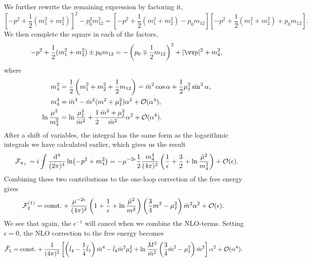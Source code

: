 We further rewrite the remaining expression by factoring it,
%
\begin{equation}
    \left[-p^2 + \frac{1}{2}(m_1^2 + m_2^2)\right]^2 - p_0^2 m_{12}^2
    = \left[-p^2 + \frac{1}{2}(m_1^2 + m_2^2) - p_0 m_{12} \right]
    \left[-p^2 + \frac{1}{2}(m_1^2 + m_2^2) + p_0 m_{12} \right].
\end{equation}
%
We then complete the square in each of the factors,
%
\begin{equation}
    - p^2 + \frac{1}{2}(m_1^2 + m_2^2) \pm p_0 m_{12}
    = - \left(p_0 \mp \frac{1}{2}m_{12}\right)^2 + |\vv p|^2 + m_4^2,
\end{equation}
%
where
%
\begin{align}
    m_4^2 
    & = \frac{1}{2}
    \left(
        m_1^2 +m_2^2 +\frac{1}{2}m_{12}
     \right)
    = \bar m^2 \cos\alpha + \frac{1}{2} \mu_I^2 \sin^2 \alpha, \\
    m_4^4
    & = \bar m^4 - \bar m^2(m^2 + \mu_I^2) \alpha^2 + \mathcal O(\alpha^4), \\
    \ln \frac{\mu^2}{m_4^2} 
    & = \ln \frac{\mu_I^2}{\bar m^2} 
    + \frac{1}{2}\frac{\bar m^2 + \mu_I^2}{\bar m^2}\alpha^2
    + \mathcal O(\alpha^4).
\end{align}
%
After a shift of variables, the integral has the same form as the logarithmic integrals we have calculated earlier, which gives us the result
%
\begin{equation}
    \mathcal{F}_{\pi_\pm}
    = i \int \frac{\dd^4}{(2\pi)^4}
    \ln(-p^2 + m_4^2)
    = 
    - \mu^{-2\epsilon}\frac{1}{2} \frac{m_4^4}{(4 \pi)^2}
    \left(\frac{1}{\epsilon} + \frac{3}{2} + \ln \frac{\tilde \mu^2}{m_4^2}\right)+ \mathcal{O}(\epsilon).
\end{equation}
%
Combining these two contributions to the one-loop correction of the free energy gives
%
\begin{align*}
    \mathcal{F}_2^{(1)}
    &=
    \mathrm{const.}
    +
    \frac{\mu^{-2 \epsilon } }{(4 \pi)^2} 
    \left(1 + \frac{1}{\epsilon} + \ln \frac{\tilde \mu^2}{m^2}\right)
    \left(\frac{3}{4}m^2 - \mu_I^2\right)
    \bar m^2 \alpha^2+ \mathcal{O}(\epsilon).
\end{align*}
%
We see that again, the $\epsilon^{-1}$ will cancel when we combine the NLO-terms.
Setting $\epsilon = 0$, the NLO correction to the free energy becomes
%
\begin{align}
    \tilde {\mathcal{F}}_1
    & = 
    \mathrm{const.}+ 
    \frac{1}{(4\pi)^2}
    \left[
        \left(
            \bar l_4 - \frac{1}{4}\bar l_3
        \right)\bar m^4
        -\bar l_4\bar m^2\mu_I^2
        + \ln\frac{M^2}{\bar m^2}
        \left(\frac{3}{4}\bar m^2 - \mu_I^2\right)\bar m^2
    \right]\alpha^2
    + \mathcal O(\alpha^4).
\end{align}
